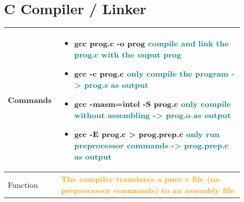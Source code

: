 \documentclass[main.tex,fontsize=8pt,paper=a4,paper=portrait,DIV=calc,]{scrartcl}
\begin{document}
\begin{table}[ht!]
\section{C Compiler / Linker}
\begin{tabular}{|m{0.2\linewidth}|m{0.755\linewidth}|}
\hline
Commands &
\begin{itemize}
  \item gcc prog.c -o prog \textcolor{teal}{compile and link the prog.c with the ouput prog}
  \item gcc -c prog.c \textcolor{teal}{only compile the program -> prog.s as output}
  \item gcc -masm=intel -S prog.c \textcolor{teal}{only compile without assembling -> prog.o as output}
  \item gcc -E prog.c > prog.prep.c \textcolor{teal}{only run preprocessor commands -> prog.prep.c as output}
  \vspace{-3mm}
\end{itemize}\\
\hline
Function & 
\textcolor{orange}{\textbf{The compiler translates a pure c file (no preprocessor commands) to an assembly file}}\\
\hline
\end{tabular}
\end{table}
\end{document}
